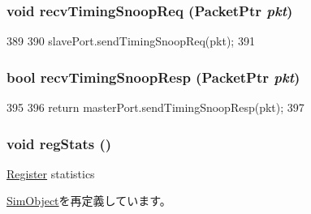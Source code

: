 \hypertarget{classCommMonitor_aff3031c56fc4947a19695c868bb8233e}{
\subsubsection[{recvTimingSnoopReq}]{\setlength{\rightskip}{0pt plus 5cm}void recvTimingSnoopReq ({\bf PacketPtr} {\em pkt})}}
\label{classCommMonitor_aff3031c56fc4947a19695c868bb8233e}



\begin{DoxyCode}
389 {
390     slavePort.sendTimingSnoopReq(pkt);
391 }
\end{DoxyCode}
\hypertarget{classCommMonitor_a9b643d565edc21dac11ce15a560238a7}{
\subsubsection[{recvTimingSnoopResp}]{\setlength{\rightskip}{0pt plus 5cm}bool recvTimingSnoopResp ({\bf PacketPtr} {\em pkt})}}
\label{classCommMonitor_a9b643d565edc21dac11ce15a560238a7}



\begin{DoxyCode}
395 {
396     return masterPort.sendTimingSnoopResp(pkt);
397 }
\end{DoxyCode}
\hypertarget{classCommMonitor_a4dc637449366fcdfc4e764cdf12d9b11}{
\subsubsection[{regStats}]{\setlength{\rightskip}{0pt plus 5cm}void regStats ()}}
\label{classCommMonitor_a4dc637449366fcdfc4e764cdf12d9b11}
\hyperlink{classRegister}{Register} statistics 

\hyperlink{classSimObject_a4dc637449366fcdfc4e764cdf12d9b11}{SimObject}を再定義しています。


